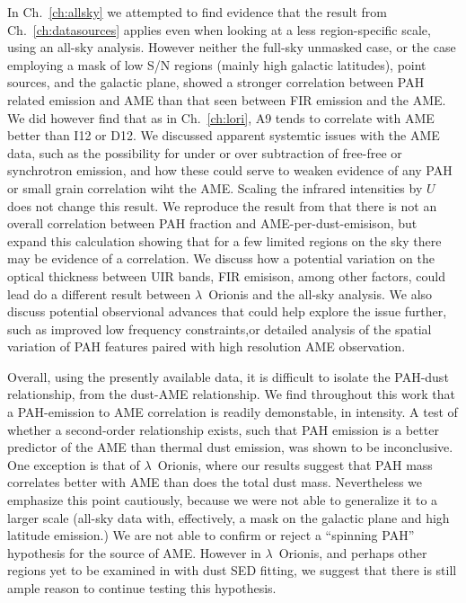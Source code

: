   In Ch.~\ref{ch:allsky} we attempted to find evidence that the result from Ch.~\ref{ch:datasources} applies even when looking at a less region-specific scale, using an all-sky analysis. However neither the full-sky unmasked case, or the case employing a mask of low S/N regions (mainly high galactic latitudes), point sources, and the galactic plane, showed a stronger correlation between PAH related emission and AME than that seen between FIR emission and the AME. We did however find that as in Ch.~\ref{ch:lori}, A9 tends to correlate with AME better than I12 or D12. We discussed apparent systemtic issues with the AME data, such as the possibility for under or over subtraction of free-free or synchrotron emission, and how these could serve to weaken evidence of any PAH or small grain correlation wiht the AME. Scaling the infrared intensities by $U$ does not change this result. We reproduce the result from \cite{hensley16} that there is not an overall correlation between PAH fraction and AME-per-dust-emisison, but expand this calculation showing that for a few limited regions on the sky there may be evidence of a correlation. We discuss how a potential variation on the optical thickness between UIR bands, FIR emisison, among other factors, could lead do a different result between $\lambda$~Orionis and the all-sky analysis. We also discuss potential observional advances that could help explore the issue further, such as improved low frequency constraints,or detailed analysis of the spatial variation of PAH features paired with high resolution AME observation.

  Overall, using the presently available data, it is difficult to isolate the PAH-dust relationship, from the dust-AME relationship. We find throughout this work that a PAH-emission to AME correlation is readily demonstable, in intensity. A test of whether a second-order relationship exists, such that PAH emission is a better predictor of the AME than thermal dust emission, was shown to be inconclusive. One exception is that of $\lambda$~Orionis, where our results suggest that PAH mass correlates better with AME than does the total dust mass. Nevertheless we emphasize this point cautiously, because we were not able to generalize it to a larger scale (all-sky data with, effectively, a mask on the galactic plane and high latitude emission.)  We are not able to confirm or reject a ``spinning PAH'' hypothesis for the source of AME. However in $\lambda$~Orionis, and perhaps other regions yet to be examined in with dust SED fitting, we suggest that there is still ample reason to continue testing this hypothesis.

